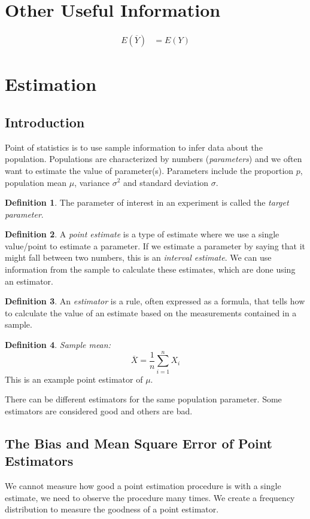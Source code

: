 \documentclass[12 pt]{article}
\theoremstyle{definition}
\newtheorem{defn}{Definition}
\begin{document}
        \section*{Other Useful Information}
        \begin{align*}
          E(\overline{Y}) & = E(Y)
        \end{align*}
        \setcounter{section}{7}
        \section{Estimation}
        \subsection{Introduction}
        Point of statistics is to use sample information to infer data
        about the population. Populations are characterized by numbers
        (\textit{parameters}) and we often want to estimate the value
        of parameter(s). Parameters include the proportion $p$,
        population mean $\mu$, variance $\sigma^2$ and standard
        deviation $\sigma$.
        \begin{defn}
          The parameter of interest in an experiment is called the
          \textit{target parameter}.
        \end{defn}
        \begin{defn}
          A \textit{point estimate} is a type of estimate where we use
          a single value/point to estimate a parameter. If we estimate
          a parameter by saying that it might fall between two
          numbers, this is an \textit{interval estimate}. We can use
          information from the sample to calculate these estimates,
          which are done using an estimator.
        \end{defn}
        \begin{defn}
          An \textit{estimator} is a rule, often expressed as a
          formula, that tells how to calculate the value of an
          estimate based on the measurements contained in a sample.
        \end{defn}
        \begin{defn}
          \textit{Sample mean:}
          $$\overline{X} = \frac{1}{n} \sum_{i=1}^n X_i$$ This is an
          example point estimator of $\mu$.
        \end{defn}
        There can be different estimators for the same population
        parameter. Some estimators are considered good and others are bad.
        \subsection{The Bias and Mean Square Error of Point
          Estimators}
        We cannot measure how good a point estimation procedure is
        with a single estimate, we need to observe the procedure many
        times. We create a frequency distribution to measure the
        goodness of a point estimator.
\end{document}
